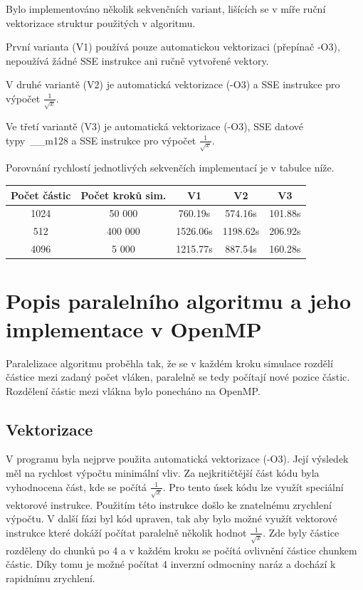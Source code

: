 \documentclass[12pt]{article}
\begin{document}
Bylo implementováno několik sekvenčních variant, lišících se v míře ruční vektorizace struktur použitých v algoritmu.

První varianta (V1) používá pouze automatickou vektorizaci (přepínač -O3), nepoužívá žádné SSE instrukce ani ručně vytvořené vektory.

V druhé variantě (V2) je automatická vektorizace (-O3) a SSE instrukce pro výpočet ${\frac{1}{\sqrt{x}}}$.

Ve třetí variantě (V3) je automatická vektorizace (-O3), SSE datové typy~\_\_m128 a SSE in\-struk\-ce pro výpočet ${\frac{1}{\sqrt{x}}}$.

Porovnání rychlostí jednotlivých sekvenčích implementací je v tabulce níže.

\begin{center}
\begin{tabular}{c | c | c | c | c}
\textbf{Počet částic} & \textbf{Počet kroků sim.}  & \textbf{V1} & \textbf{V2} & \textbf{V3} \\ \hline \hline
1024 & 50 000 & 760.19s & 574.16s & 101.88s \\ \hline
512 & 400 000 & 1526.06s & 1198.62s & 206.92s \\ \hline
4096 & 5 000 & 1215.77s & 887.54s & 160.28s \\ \hline
\end{tabular}
\end{center}


\section{Popis paralelního algoritmu a jeho implementace v OpenMP}
Paralelizace algoritmu proběhla tak, že se v každém kroku simulace rozdělí částice mezi zadaný počet vláken, paralelně se tedy počítají nové pozice částic.
Rozdělení částic mezi vlákna bylo ponecháno na OpenMP.

\subsection{Vektorizace}

V prog\-ramu byla nej\-prve pou\-žita au\-toma\-tická vekto\-ri\-za\-ce (-O3).
Její výsledek měl na rychlost výpočtu minimální vliv. Za nejkritičtější část kódu byla vyhodnocena část, kde se počítá ${\frac{1}{\sqrt{x}}}$.
Pro tento úsek kódu lze využít speciální vektorové instrukce. Použitím této instrukce došlo ke znatelnému zrychlení výpočtu.
V další fázi byl kód upraven, tak aby bylo možné využít vektorové instrukce které dokáží počítat paralelně několik hodnot ${\frac{1}{\sqrt{x}}}$.
Zde byly částice rozděleny do chunků po 4 a v každém kroku se počítá ovlivnění částice chunkem částic.
Díky tomu je možné počítat 4 inverzní odmocniny naráz a dochází k rapidnímu zrychlení. 
\end{document}
